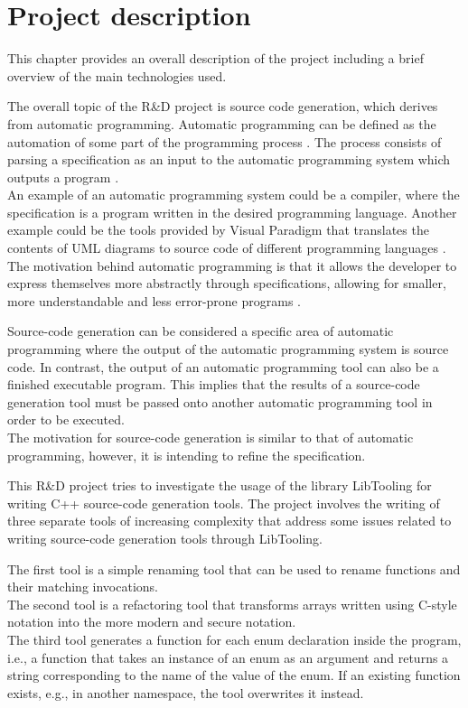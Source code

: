 \chapter{Project description}
This chapter provides an overall description of the project including a brief overview of the main technologies used.

The overall topic of the R\&D project is source code generation, which derives from automatic programming. Automatic programming can be defined as the automation of some part of the programming process \cite{barrAutomaticProgramming1982}. The process consists of parsing a specification as an input to the automatic programming system which outputs a program \cite{novakjr.CS394PAutomatic}.\\
An example of an automatic programming system could be a compiler, where the specification is a program written in the desired programming language. Another example could be the tools provided by Visual Paradigm that translates the contents of UML diagrams to source code of different programming languages \cite{visualparadigmUMLCodeGeneration}.\\
The motivation behind automatic programming is that it allows the developer to express themselves more abstractly through specifications, allowing for smaller, more understandable and less error-prone programs \cite{novakjr.CS394PAutomatic}.

Source-code generation can be considered a specific area of automatic programming where the output of the automatic programming system is source code. In contrast, the output of an automatic programming tool can also be a finished executable program. This implies that the results of a source-code generation tool must be passed onto another automatic programming tool in order to be executed.\\
The motivation for source-code generation is similar to that of automatic programming, however, it is intending to refine the specification.

This R\&D project tries to investigate the usage of the library LibTooling for writing C++ source-code generation tools. The project involves the writing of three separate tools of increasing complexity that address some issues related to writing source-code generation tools through LibTooling.

The first tool is a simple renaming tool that can be used to rename functions and their matching invocations.\\
The second tool is a refactoring tool that transforms arrays written using C-style notation into the more modern and secure  notation. \\
The third tool generates a  function for each enum declaration inside the program, i.e., a function that takes an instance of an enum as an argument and returns a string corresponding to the name of the value of the enum. If an existing  function exists, e.g., in another namespace, the tool overwrites it instead.

